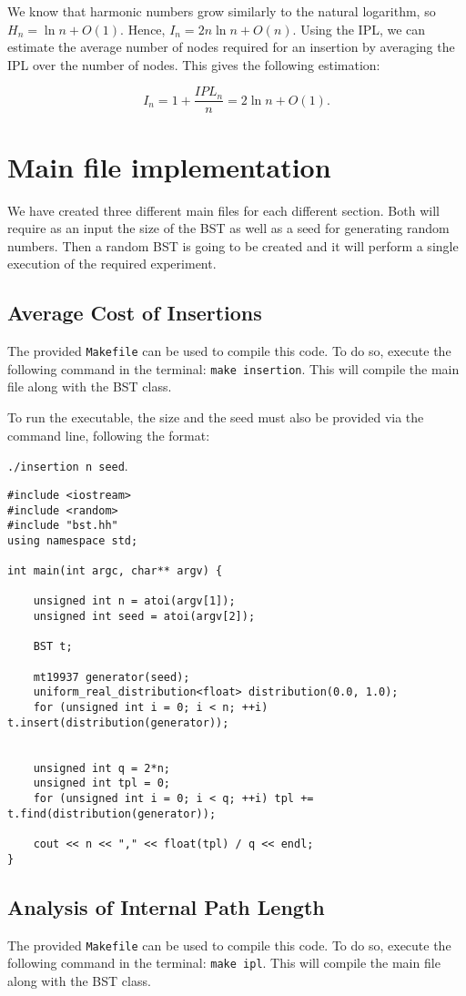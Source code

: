 We know that harmonic numbers grow similarly to the natural logarithm, so \( H_n = \ln n + O(1) \). Hence, \( I_n = 2n \ln n + O(n) \). Using the IPL, we can estimate the average number of nodes required for an insertion by averaging the IPL over the number of nodes. This gives the following estimation:  

\[
I_n = 1 + \frac{IPL_n}{n} = 2 \ln n + O(1).
\]

\section{Main file implementation}
We have created three different main files for each different section. Both will require as an input the size of the BST as well as a seed for generating random numbers. Then a random BST is going to be created and it will perform a single execution of the required experiment.

\subsection{Average Cost of Insertions}
The provided \texttt{Makefile} can be used to compile this code. To do so, execute the following command in the terminal: \texttt{make insertion}. This will compile the main file along with the BST class.  

To run the executable, the size and the seed must also be provided via the command line, following the format:  

\texttt{./insertion n seed}.

\begin{verbatim}
#include <iostream>
#include <random>
#include "bst.hh"
using namespace std;

int main(int argc, char** argv) {

    unsigned int n = atoi(argv[1]);
    unsigned int seed = atoi(argv[2]);

    BST t;

    mt19937 generator(seed);
    uniform_real_distribution<float> distribution(0.0, 1.0);
    for (unsigned int i = 0; i < n; ++i) t.insert(distribution(generator));
    

    unsigned int q = 2*n;
    unsigned int tpl = 0;
    for (unsigned int i = 0; i < q; ++i) tpl += t.find(distribution(generator));

    cout << n << "," << float(tpl) / q << endl;
}
\end{verbatim}

\subsection{Analysis of Internal Path Length}
The provided \texttt{Makefile} can be used to compile this code. To do so, execute the following command in the terminal: \texttt{make ipl}. This will compile the main file along with the BST class.  

